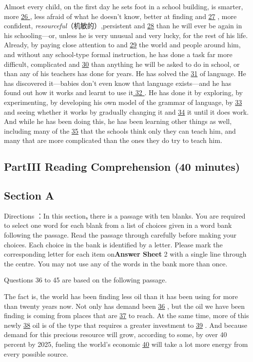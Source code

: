 \documentclass[UTF8,11pt]{ctexart}
\begin{document}
Almost every child, on the first day he sets foot in a school building, is smarter, more \uline{26 }, less afraid of what he doesn’t know, better at finding and \uline{27} , more confident,\textit{ resourceful}（机敏的）,persistent and \uline{28} than he will ever be again in his schooling—or, unless he is very unusual and very lucky, for the rest of his life. Already, by paying close attention to and \uline{29} the world and people around him, and without any school-type formal instruction, he has done a task far more difficult, complicated and \uline{30} than anything he will be asked to do in school, or than any of his teachers has done for years. He has solved the \uline{31} of language. He has discovered it—babies don’t even know that language exists—and he has found out how it works and learnt to use it\uline{ 32 }. He has done it by exploring, by experimenting, by developing his own model of the grammar of language, by \uline{33} and seeing whether it works by gradually changing it and \uline{34} it until it does work. And while he has been doing this, he has been learning other things as well, including many of the \uline{35} that the schools think only they can teach him, and many that are more complicated than the ones they do try to teach him.


\subsection*{\textbf{Part}III \textbf{Reading Comprehension} \textbf{(40 minutes)}}


\subsection*{\textbf{Section A}}


Directions ：In this section\textbf{,} there is a passage with ten blanks. You are required to select one word for each blank from a list of choices given in a word bank following the passage. Read the passage through carefully before making your choices. Each choice in the bank is identified by a letter. Please mark the corresponding letter for each item on\textbf{Answer Sheet} 2 with a single line through the centre. You may not use any of the words in the bank more than once.


Questions 36 to 45 are based on the following passage.


The fact is, the world has been finding less oil than it has been using for more than twenty years now. Not only has demand been \uline{36} , but the oil we have been finding is coming from places that are \uline{37} to reach. At the same time, more of this newly \uline{38} oil is of the type that requires a greater investment to \uline{39} . And because demand for this precious resource will grow, according to some, by over 40 percent by 2025, fueling the world’s economic \uline{40} will take a lot more energy from every possible source.
\end{document}
